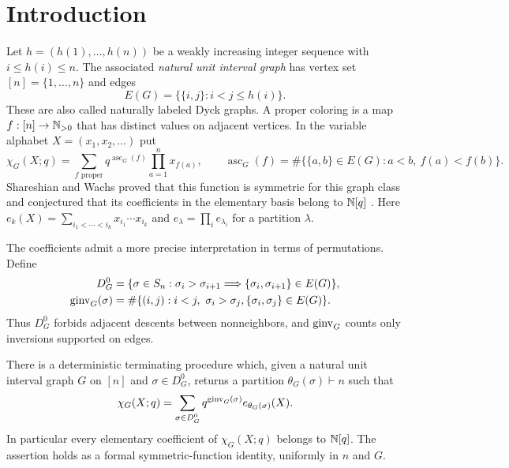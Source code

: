 \section{Introduction}
\label{main:introduction}

Let $h=(h(1),\ldots,h(n))$ be a weakly increasing integer sequence with
$i\le h(i)\le n$. The associated \emph{natural unit interval graph} has
vertex set $[n]=\{1,\ldots,n\}$ and edges
\[
 E(G)=\bigl\{\{i,j\}:i<j\le h(i)\bigr\}.
\]
These are also called naturally labeled Dyck graphs. A proper coloring is a
map $f:[n]\to\mathbb N_{>0}$ that has distinct values on adjacent vertices. In the
variable alphabet $X=(x_1,x_2,\ldots)$ put
\begin{equation}
 \chi_G(X;q)=\sum_{f\text{ proper}}
 q^{\operatorname{asc}_G(f)}\prod_{a=1}^n x_{f(a)},
 \qquad
 \operatorname{asc}_G(f)=
 \#\{\{a,b\}\in E(G):a<b,\ f(a)<f(b)\}.
 \label{main:csf}
\end{equation}
Shareshian and Wachs proved that this function is symmetric for this graph
class and conjectured that its coefficients in the elementary basis belong
to $\mathbb N[q]$ \cite{SW16}. Here
$e_k(X)=\sum_{i_1<\cdots<i_k}x_{i_1}\cdots x_{i_k}$ and
$e_\lambda=\prod_i e_{\lambda_i}$ for a partition $\lambda$.

The coefficients admit a more precise interpretation in terms of
permutations. Define
\begin{align*}
 D_G^0&=\{\sigma\in S_n:
   \sigma_i>\sigma_{i+1}\Longrightarrow
   \{\sigma_i,\sigma_{i+1}\}\in E(G)\},\\
 \operatorname{ginv}_G(\sigma)&=\#\{(i,j):i<j,\ \sigma_i>\sigma_j,
                    \{\sigma_i,\sigma_j\}\in E(G)\}.
\end{align*}
Thus $D_G^0$ forbids adjacent descents between nonneighbors, and
$\operatorname{ginv}_G$ counts only inversions supported on edges.

\begin{theorem}
\label{main:theorem}
There is a deterministic terminating procedure which, given a natural
unit interval graph $G$ on $[n]$ and $\sigma\in D_G^0$, returns a partition
$\theta_G(\sigma)\vdash n$ such that
\begin{equation}
 \chi_G(X;q)=\sum_{\sigma\in D_G^0}
       q^{\operatorname{ginv}_G(\sigma)}e_{\theta_G(\sigma)}(X).
 \label{main:witness}
\end{equation}
In particular every elementary coefficient of $\chi_G(X;q)$ belongs to
$\mathbb N[q]$. The assertion holds as a formal symmetric-function identity,
uniformly in $n$ and $G$.
\end{theorem}

